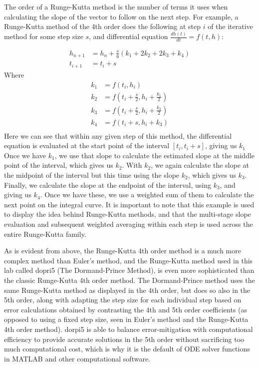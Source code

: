 \documentclass[11pt]{article}
\begin{document}
  The order of a Runge-Kutta method is the number of terms it uses when calculating the slope of the vector to follow on the next step.
For example, a Runge-Kutta method of the 4th order does the following at step $i$ of the iterative method for some step size $s$, and differential equation $\frac{dh(t)}{dt} = f(t,h)$:

\[\begin{align}
    h_{n+1} &= h_n + \frac{s}{6}(k_1 + 2k_2 + 2k_3 + k_4)\\
    t_{i+1} &= t_i + s
\end{align}\]
Where
\[\begin{align}
    k_1 &= f(t_i, h_i)\\
    k_2 &= f(t_i + \frac{s}{2}, h_i + \frac{k_1}{2})\\
    k_3 &= f(t_i + \frac{s}{2}, h_i + \frac{k_2}{2})\\
    k_4 &= f(t_i + s, h_i + k_3)\\
\end{align}\]
Here we can see that within any given step of this method, the differential equation is evaluated at the start point of the interval $[t_i, t_i + s]$, giving us $k_1$
Once we have $k_1$, we use that slope to calculate the estimated slope at the middle point of the interval, which gives us $k_2$.
With $k_2$, we again calculate the slope at the midpoint of the interval but this time using the slope $k_2$, which gives us $k_3$.
Finally, we calculate the slope at the endpoint of the interval, using $k_3$, and giving us $k_4$.
Once we have these, we use a weighted sum of them to calculate the next point on the integral curve.
It is important to note that this example is used to display the idea behind Runge-Kutta methods, and that the multi-stage slope evaluation and subsequent weighted averaging within each step is used across the entire Runge-Kutta family.

As is evident from above, the Runge-Kutta 4th order method is a much more complex method than Euler's method, and the Runge-Kutta method used in this lab called dopri5 (The Dormand-Prince Method), is even more sophisticated than the classic Runge-Kutta 4th order method.
The Dormand-Prince method uses the same Runge-Kutta method as displayed in the 4th order, but does so also in the 5th order, along with adapting the step size for each individual step based on error calculations obtained by contrasting the 4th and 5th order coefficients (as opposed to using a fixed step size, seen in Euler's method and the Runge-Kutta 4th order method).
dorpi5 is able to balance error-mitigation with computational efficiency to provide accurate solutions in the 5th order without sacrificing too much computational cost, which is why it is the default of ODE solver functions in MATLAB and other computational software.
\end{document}
